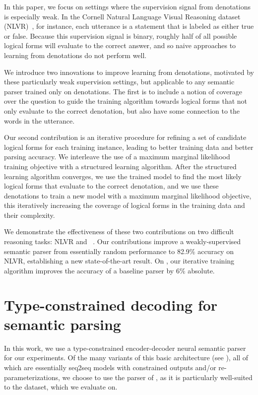 In this paper, we focus on settings where the supervision signal from denotations is especially weak.  In the Cornell Natural Language Visual Reasoning dataset (NLVR)~\citep{suhr2017corpus}, for instance, each utterance is a statement that is labeled as either true or false.  Because this supervision signal is binary, roughly half of all possible logical forms will evaluate to the correct answer, and so naive approaches to learning from denotations do not perform well.

We introduce two innovations to improve learning from denotations, motivated by these particularly weak supervision settings, but applicable to any semantic parser trained only on denotations.  The first is to include a notion of coverage over the question to guide the training algorithm towards logical forms that not only evaluate to the correct denotation, but also have some connection to the words in the utterance.

Our second contribution is an iterative procedure for refining a set of candidate logical forms for each training instance, leading to better training data and better parsing accuracy.  We interleave the use of a maximum marginal likelihood training objective with a structured learning algorithm.  After the structured learning algorithm converges, we use the trained model to find the most likely logical forms that evaluate to the correct denotation, and we use these denotations to train a new model with a maximum marginal likelihood objective, this iteratively increasing the coverage of logical forms in the training data and their complexity.

We demonstrate the effectiveness of these two contributions on two difficult reasoning tasks: NLVR and \WTQ~\citep{pasupat2015compositional}.  Our contributions improve a weakly-supervised semantic parser from essentially random performance to 82.9\% accuracy on NLVR, establishing a new state-of-the-art result.  On \WTQ{}, our iterative training algorithm improves the accuracy of a baseline parser by 6\% absolute.

\section{Type-constrained decoding for semantic parsing} \label{sec:type_constrained_decoding}
In this work, we use a type-constrained encoder-decoder neural semantic parser for our experiments.  Of the many variants of this basic architecture (see ), all of which are essentially seq2seq models with constrained outputs and/or re-parameterizations, we choose to use the parser of \citet{krishnamurthy2017neural}, as it is particularly well-suited to the \WTQ{} dataset, which we evaluate on.

